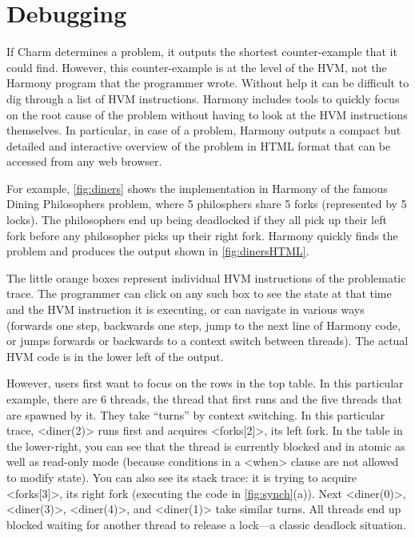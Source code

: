 \documentclass[twocolumn]{article}
\begin{document}
\section{Debugging}

If Charm determines a problem, it outputs the shortest counter-example that
it could find.  However, this counter-example is at the level of the HVM,
not the Harmony program that the programmer wrote.  Without help it can be
difficult to dig through a list of HVM instructions.
Harmony includes tools to quickly focus on the root cause of the
problem without having to look at the HVM instructions themselves.
In particular, in case of a problem, Harmony outputs a compact
but detailed and interactive overview of the problem in HTML format that
can be accessed from any web browser.

For example, \autoref{fig:diners} shows the implementation
in Harmony of the famous Dining Philosophers problem, where 5 philosphers
share 5 forks (represented by 5 locks).
The philosophers end up being deadlocked
if they all pick up their left fork before any philosopher picks up
their right fork.
Harmony quickly finds the problem and produces the output
shown in \autoref{fig:dinersHTML}.

The little orange boxes represent individual HVM instructions of
the problematic trace.  The programmer can click on any such box
to see the state at that time and the HVM instruction it is executing,
or can navigate in various ways (forwards one step, backwards
one step, jump to the next line of Harmony code, or jumps forwards
or backwards to a context switch between threads).  The actual HVM
code is in the lower left of the output.

However, users first want to focus on the rows in the top table.
In this particular example, there are 6 threads, the thread that
first runs and the five threads that are spawned by it.  They take
``turns'' by context switching.  In this particular trace, <{diner(2)}>
runs first and acquires <{forks[2]}>, its left fork.  In the table
in the lower-right, you can see that the thread is currently blocked
and in atomic as well as read-only mode (because conditions in a <{when}>
clause are not allowed to modify state).  You can also see its stack
trace: it is trying to acquire <{forks[3]}>, its right fork (executing
the code in \autoref{fig:synch}(a)).  Next <{diner(0)}>, <{diner(3)}>,
<{diner(4)}>, and <{diner(1)}> take similar turns.  All threads end up
blocked waiting for another thread to release a lock---a classic
deadlock situation.
\end{document}
